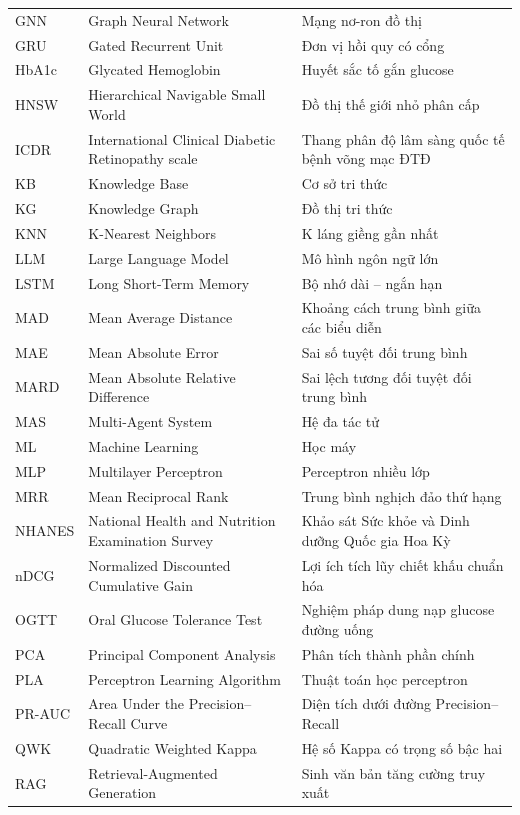 \begin{spacing}{1.1}
\begin{longtable}{@{}L{2.3cm}L{6.3cm}L{6.0cm}@{}}
GNN & Graph Neural Network & Mạng nơ-ron đồ thị \\
GRU & Gated Recurrent Unit & Đơn vị hồi quy có cổng \\
HbA1c & Glycated Hemoglobin & Huyết sắc tố gắn glucose \\
HNSW & Hierarchical Navigable Small World & Đồ thị thế giới nhỏ phân cấp \\
ICDR & International Clinical Diabetic Retinopathy scale & Thang phân độ lâm sàng quốc tế bệnh võng mạc ĐTĐ \\
KB & Knowledge Base & Cơ sở tri thức \\
KG & Knowledge Graph & Đồ thị tri thức \\
KNN & K-Nearest Neighbors & K láng giềng gần nhất \\
LLM & Large Language Model & Mô hình ngôn ngữ lớn \\
LSTM & Long Short-Term Memory & Bộ nhớ dài – ngắn hạn \\
MAD & Mean Average Distance & Khoảng cách trung bình giữa các biểu diễn \\
MAE & Mean Absolute Error & Sai số tuyệt đối trung bình \\
MARD & Mean Absolute Relative Difference & Sai lệch tương đối tuyệt đối trung bình \\
MAS & Multi-Agent System & Hệ đa tác tử \\
ML & Machine Learning & Học máy \\
MLP & Multilayer Perceptron & Perceptron nhiều lớp \\
MRR & Mean Reciprocal Rank & Trung bình nghịch đảo thứ hạng \\
NHANES & National Health and Nutrition Examination Survey & Khảo sát Sức khỏe và Dinh dưỡng Quốc gia Hoa Kỳ \\
nDCG & Normalized Discounted Cumulative Gain & Lợi ích tích lũy chiết khấu chuẩn hóa \\
OGTT & Oral Glucose Tolerance Test & Nghiệm pháp dung nạp glucose đường uống \\
PCA & Principal Component Analysis & Phân tích thành phần chính \\
PLA & Perceptron Learning Algorithm & Thuật toán học perceptron \\
PR-AUC & Area Under the Precision–Recall Curve & Diện tích dưới đường Precision–Recall \\
QWK & Quadratic Weighted Kappa & Hệ số Kappa có trọng số bậc hai \\
RAG & Retrieval-Augmented Generation & Sinh văn bản tăng cường truy xuất \\

\end{longtable}
\end{spacing}

